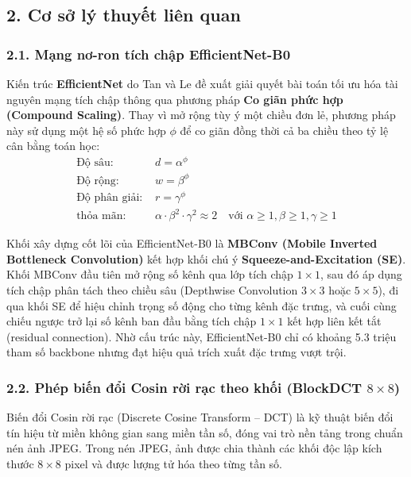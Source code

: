 \subsection{2. Cơ sở lý thuyết liên quan}

\subsubsection{2.1. Mạng nơ-ron tích chập EfficientNet-B0}
\indent\indent Kiến trúc \textbf{EfficientNet} do Tan và Le \cite{tan2019efficientnet} đề xuất giải quyết bài toán tối ưu hóa tài nguyên mạng tích chập thông qua phương pháp \textbf{Co giãn phức hợp (Compound Scaling)}. Thay vì mở rộng tùy ý một chiều đơn lẻ, phương pháp này sử dụng một hệ số phức hợp $\phi$ để co giãn đồng thời cả ba chiều theo tỷ lệ cân bằng toán học:
\begin{equation}
\begin{aligned}
\text{Độ sâu: } & d = \alpha^\phi \\
\text{Độ rộng: } & w = \beta^\phi \\
\text{Độ phân giải: } & r = \gamma^\phi \\
\text{thỏa mãn: } & \alpha \cdot \beta^2 \cdot \gamma^2 \approx 2 \quad \text{với } \alpha \ge 1, \beta \ge 1, \gamma \ge 1
\end{aligned}
\end{equation}

Khối xây dựng cốt lõi của EfficientNet-B0 là \textbf{MBConv (Mobile Inverted Bottleneck Convolution)} kết hợp khối chú ý \textbf{Squeeze-and-Excitation (SE)}. Khối MBConv đầu tiên mở rộng số kênh qua lớp tích chập $1 \times 1$, sau đó áp dụng tích chập phân tách theo chiều sâu (Depthwise Convolution $3 \times 3$ hoặc $5 \times 5$), đi qua khối SE để hiệu chỉnh trọng số động cho từng kênh đặc trưng, và cuối cùng chiếu ngược trở lại số kênh ban đầu bằng tích chập $1 \times 1$ kết hợp liên kết tắt (residual connection). Nhờ cấu trúc này, EfficientNet-B0 chỉ có khoảng 5.3 triệu tham số backbone nhưng đạt hiệu quả trích xuất đặc trưng vượt trội.

\subsubsection{2.2. Phép biến đổi Cosin rời rạc theo khối (BlockDCT $8 \times 8$)}
\indent\indent Biến đổi Cosin rời rạc (Discrete Cosine Transform -- DCT) \cite{ahmed1974discrete} là kỹ thuật biến đổi tín hiệu từ miền không gian sang miền tần số, đóng vai trò nền tảng trong chuẩn nén ảnh JPEG. Trong nén JPEG, ảnh được chia thành các khối độc lập kích thước $8 \times 8$ pixel và được lượng tử hóa theo từng tần số.\vspace{0.3cm}

